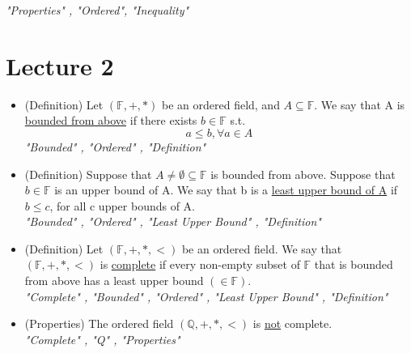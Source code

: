 \documentclass{article}
\begin{document}
\begin{itemize}
\begin{enumerate}
    \end{enumerate}
    \textit{"Properties" , "Ordered", "Inequality"}
    
    
\end{itemize}


\section{Lecture 2}
\begin{itemize}
    \item (Definition) Let $(\mathbb{F},+,*)$ be an ordered field, and $A \subseteq \mathbb{F}$. We say that A is \underline{bounded from above} if there exists $b \in \mathbb{F}$ s.t. $$ a \leq b, \forall a \in A$$
    \textit{"Bounded" , "Ordered" , "Definition"}
    
    \item (Definition) Suppose that $A  \neq \emptyset \subseteq \mathbb{F}$ is bounded from above. Suppose that $b \in \mathbb{F}$ is an upper bound of A. We say that b is a \underline{least upper bound of A} if $b \leq c$, for all c upper bounds of A. \\
    \vspace{.25cm} \textit{"Bounded" , "Ordered" , "Least Upper Bound" , "Definition"}
    
    \item (Definition) Let $(\mathbb{F},+,*,<)$ be an ordered field. We say that $(\mathbb{F},+,*,<)$ is \underline{complete} if every non-empty subset of $\mathbb{F}$ that is bounded from above has a least upper bound $( \in \mathbb{F})$. \\
    \vspace{.25cm} \textit{"Complete" , "Bounded" , "Ordered" , "Least Upper Bound" , "Definition"}
    
    \item (Properties) The ordered field $(\mathbb{Q},+,*,<)$ is \underline{not} complete. \\
    \vspace{.25cm} \textit{"Complete" , "Q" , "Properties"}
    

\end{itemize}
\end{document}
